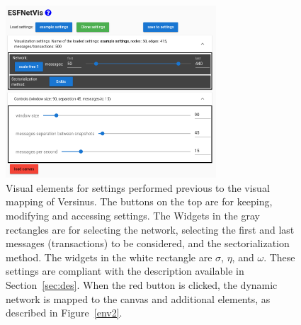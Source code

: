\documentclass[runningheads]{llncs}
\begin{document}
\begin{figure}[!h]\centering
\includegraphics[width=0.7\textwidth]{esfNetVis___}
  \caption{Visual elements for settings performed previous to the visual mapping of Versinus.
  The buttons on the top are for keeping, modifying and accessing settings.
  The Widgets in the gray rectangles are for selecting the network, selecting the first and last messages (transactions) to be considered,
  and the sectorialization method.
  The widgets in the white rectangle are $\sigma$, $\eta$, and $\omega$.
  These settings are compliant with the description available in Section~\ref{sec:des}.
  When the red button is clicked, the dynamic network is mapped to the canvas and additional elements, as described in Figure~\ref{env2}.
  }\label{env1}
\end{figure}
\end{document}
